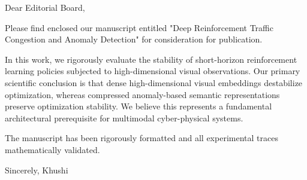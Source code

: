 Dear Editorial Board,

Please find enclosed our manuscript entitled "Deep Reinforcement Traffic Congestion and Anomaly Detection" for consideration for publication.

In this work, we rigorously evaluate the stability of short-horizon reinforcement learning policies subjected to high-dimensional visual observations. Our primary scientific conclusion is that dense high-dimensional visual embeddings destabilize optimization, whereas compressed anomaly-based semantic representations preserve optimization stability. We believe this represents a fundamental architectural prerequisite for multimodal cyber-physical systems.

The manuscript has been rigorously formatted and all experimental traces mathematically validated.

Sincerely,
Khushi
